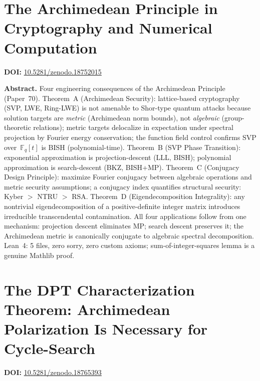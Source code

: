 \documentclass[11pt,a4paper]{article}
\begin{document}
\section{The Archimedean Principle in Cryptography and Numerical Computation}
\label{sec:p71}
\textbf{DOI:} \href{https://doi.org/10.5281/zenodo.18752015}{10.5281/zenodo.18752015}

\bigskip
\noindent\textbf{Abstract.}
Four engineering consequences of the Archimedean Principle (Paper~70). Theorem~A (Archimedean Security): lattice-based cryptography (SVP, LWE, Ring-LWE) is not amenable to Shor-type quantum attacks because solution targets are \emph{metric} (Archimedean norm bounds), not \emph{algebraic} (group-theoretic relations); metric targets delocalize in expectation under spectral projection by Fourier energy conservation; the function field control confirms SVP over~$\mathbb{F}_q[t]$ is BISH (polynomial-time). Theorem~B (SVP Phase Transition): exponential approximation is projection-descent (LLL, BISH); polynomial approximation is search-descent (BKZ, BISH+MP). Theorem~C (Conjugacy Design Principle): maximize Fourier conjugacy between algebraic operations and metric security assumptions; a conjugacy index quantifies structural security: Kyber $>$ NTRU $>$ RSA. Theorem~D (Eigendecomposition Integrality): any nontrivial eigendecomposition of a positive-definite integer matrix introduces irreducible transcendental contamination. All four applications follow from one mechanism: projection descent eliminates MP; search descent preserves it; the Archimedean metric is canonically conjugate to algebraic spectral decomposition. Lean~4: 5 files, zero sorry, zero custom axioms; sum-of-integer-squares lemma is a genuine Mathlib proof.


\section{The DPT Characterization Theorem: Archimedean Polarization Is Necessary for Cycle-Search}
\label{sec:p72}
\textbf{DOI:} \href{https://doi.org/10.5281/zenodo.18765393}{10.5281/zenodo.18765393}
\end{document}

